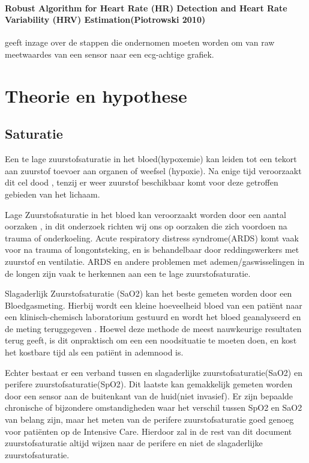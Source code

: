 \documentclass[11pt]{article}
\begin{document}
    \paragraph{Robust Algorithm for Heart Rate (HR) Detection and Heart Rate Variability (HRV) Estimation(Piotrowski 2010)} geeft inzage over de stappen die ondernomen moeten worden om van raw meetwaardes van een sensor naar een ecg-achtige grafiek.

    \section{Theorie en hypothese}\label{sec:theorie-en-hypothese}
    \subsection{Saturatie}
    Een te lage zuurstofsaturatie in het bloed(hypoxemie) kan leiden tot een tekort aan zuurstof toevoer aan organen of weefsel (hypoxie).
    Na enige tijd veroorzaakt dit cel dood \citep[]{fulda2010cellular}, tenzij er weer zuurstof beschikbaar komt voor deze getroffen gebieden van het lichaam.

    Lage Zuurstofsaturatie in het bloed kan veroorzaakt worden door een aantal oorzaken \citep{sarkar2017mechanisms}, in dit onderzoek richten wij ons op oorzaken die zich voordoen na trauma of onderkoeling.
    Acute respiratory distress syndrome(ARDS) komt vaak voor na trauma of longontsteking, en is behandelbaar door reddingswerkers met zuurstof en ventilatie\citep{brower2001treatment}. 
    ARDS en andere problemen met ademen/gaswisselingen in de longen zijn vaak te herkennen aan een te lage zuurstofsaturatie.

    Slagaderlijk Zuurstofsaturatie (SaO2) kan het beste gemeten worden door een Bloedgasmeting. 
    Hierbij wordt een kleine hoeveelheid bloed van een patiënt naar een klinisch-chemisch laboratorium gestuurd en wordt het bloed geanalyseerd en de meting teruggegeven \citep{saunders1976ear}. 
   Hoewel deze methode de meest nauwkeurige resultaten terug geeft, is dit onpraktisch om een een noodsituatie  te moeten doen, en kost het kostbare tijd als een patiënt in ademnood is.

    Echter bestaat er een verband tussen en slagaderlijke zuurstofsaturatie(SaO2) en perifere zuurstofsaturatie(SpO2)\citep{louw2001accuracy}. 
    Dit laatste kan gemakkelijk gemeten worden door een sensor aan de buitenkant van de huid(niet invasief). 
    Er zijn bepaalde chronische of bijzondere omstandigheden waar het verschil tussen SpO2 en SaO2 van belang zijn, maar het meten van de perifere zuurstofsaturatie goed genoeg voor patiënten op de Intensive Care.\citep{thijssen2019facing} 
    Hierdoor zal in de rest van dit document zuurstofsaturatie altijd wijzen naar de perifere en niet de slagaderlijke zuurstofsaturatie.
\end{document}
